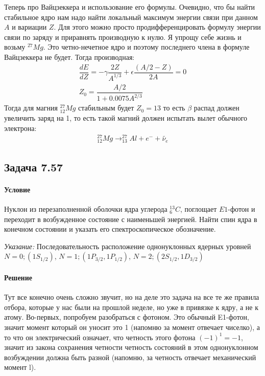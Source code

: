 \documentclass[12pt]{article}
\begin{document}
Теперь про Вайцзеккера и использование его формулы. Очевидно, что бы найти стабильное ядро нам надо найти локальный максимум энергии связи при данном $A$ и вариации $Z$. Для этого можно просто продифференцировать формулу энергии связи по заряду и приравнять производную к нулю. Я упрощу себе жизнь и возьму $^{27}Mg$. Это четно-нечетное ядро и поэтому последнего члена в формуле Вайцзеккера не будет. Тогда производная:
\begin{gather*}
    \dfrac{dE}{dZ} = -\gamma \dfrac{2Z}{A^{1/3}} + \epsilon \dfrac{(A/2-Z)}{2A} = 0\\
    Z_0 = \dfrac{A/2}{1 + 0.0075 A^{2/3}}
\end{gather*}
 Тогда для магния $^{27}_{12}Mg$ стабильным будет $Z_0=13$ то есть $\beta$ распад должен увеличить заряд на 1, то есть такой магний должен испытать вылет обычного электрона:
 \begin{gather*}
     ^{27}_{12}Mg \rightarrow ^{27}_{13}Al + e^- + \widetilde{\nu_e}
\end{gather*}

\subsection{Задача 7.57}
\label{task_}
\paragraph{Условие}
Нуклон из перезаполненной оболочки ядра углерода $^{13}_6C$, поглощает $E1$-фотон и переходит в возбужденное состояние с наименьшей энергией. Найти спин ядра в конечном состоянии и указать его спектроскопическое обозначение.

\textit{Указание:} Последовательность расположение однонуклонных ядерных уровней $N=0;(1S_{1/2})$, $N=1;(1P_{3/2}, 1P_{1/2})$, $N=2;(2S_{1/2}, 1D_{3/2})$
\paragraph{Решение}
Тут все конечно очень сложно звучит, но на деле это задача на все те же правила отбора, которые у нас были на прошлой неделе, но уже в привязке к ядру, а не к атому. Во-первых, попробуем разобраться с фотоном. Это обычный E1-фотон, значит момент который он уносит это 1 (напомню за момент отвечает чиселко), а то что он электрический означает, что четность этого фотона $(-1)^1 = -1$, значит из закона сохранения четности четность состояний в этом однонуклонном возбуждении должна быть разной (напомню, за четность отвечает механический момент l).
\end{document}
